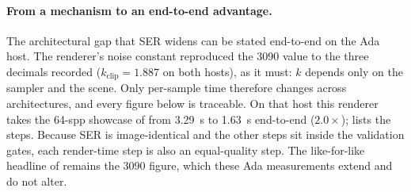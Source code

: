 \paragraph{From a mechanism to an end-to-end advantage.}
The architectural gap that SER widens can be stated end-to-end on the Ada host. The renderer's noise
constant reproduced the \num{3090} value to the three decimals recorded
($k_{\text{clip}}=\num{1.887}$ on both hosts), as it must: $k$ depends only on the
sampler and the scene. Only per-sample time therefore changes across
architectures, and every figure below is traceable. On that host this renderer takes the \num{64}-spp showcase of  from
\SI{3.29}{\second} to \SI{1.63}{\second} end-to-end ($2.0\times$);  lists
the steps.
Because SER is
image-identical and the other steps sit inside the validation gates, each render-time step is also an
equal-quality step. The like-for-like headline of  remains the \num{3090}
figure, which these Ada measurements extend and do not alter.

\begin{table}[htp]
  \centering
  \caption{End-to-end render time of the \num{64}-spp showcase on the Ada host, per configuration
step (median steady-state). SER is image-identical, so its step is an equal-quality
speedup by construction; the RIS/fast-\texttt{erf} and icosphere steps sit inside the
validation gates of  (the icosphere trades a ${\sim}\num{0.1}\%$
systematic). The rows are the recorded configurations of the probe, not a full ablation
(the combined step is dominated by RIS). The cloud pair (unrounded
\num{3.285}/\num{2.309}) is a separate \num{16}-seed session from 's A/B
(\num{3.274}/\num{2.303}); the sessions agree within \num{0.4}\,\%. The like-for-like
headline () lives on the \num{3090} host and is not modified by
these figures.}
  \label{tab:ser-eq}
\end{table}


